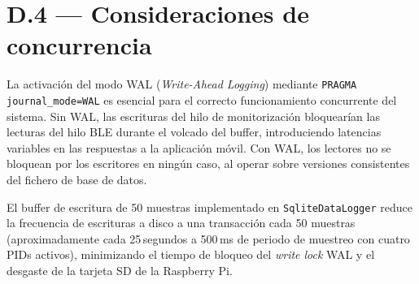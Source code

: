 \section*{D.4 — Consideraciones de concurrencia}

La activación del modo WAL (\textit{Write-Ahead Logging}) mediante
\texttt{PRAGMA journal\_mode=WAL} es esencial para el correcto funcionamiento
concurrente del sistema. Sin WAL, las escrituras del hilo de monitorización
bloquearían las lecturas del hilo BLE durante el volcado del buffer, introduciendo
latencias variables en las respuestas a la aplicación móvil. Con WAL, los lectores
no se bloquean por los escritores en ningún caso, al operar sobre versiones
consistentes del fichero de base de datos.

El buffer de escritura de 50 muestras implementado en \texttt{SqliteDataLogger}
reduce la frecuencia de escrituras a disco a una transacción cada 50 muestras
(aproximadamente cada 25\,segundos a 500\,ms de periodo de muestreo con cuatro
PIDs activos), minimizando el tiempo de bloqueo del \textit{write lock} WAL y
el desgaste de la tarjeta SD de la Raspberry Pi.
